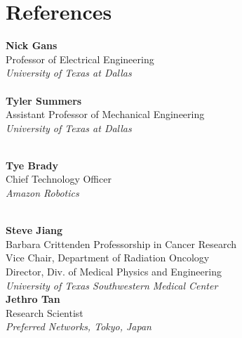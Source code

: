 \section{References}
\noindent
\begin{multicols}{2}
	
	\textbf{Nick Gans}\\
	Professor of Electrical Engineering
	\\
	\emph{University of Texas at  Dallas}
	\\\\
	\textbf{Tyler Summers}\\
	Assistant Professor of Mechanical Engineering 
	\\
	\emph{University of Texas at Dallas}\\\
	
	\textbf{Tye Brady}\\
		Chief Technology Officer	\\
	\emph{Amazon Robotics}\\\\
	
	\columnbreak
	
	\textbf{Steve Jiang}\\
	Barbara Crittenden Professorship in Cancer Research \\
	Vice Chair, Department of Radiation Oncology \\
	Director, Div. of Medical Physics and Engineering \\	
	\emph{University of Texas Southwestern Medical Center}\\
	
	\textbf{Jethro Tan}\\
	Research Scientist\\
	\emph{Preferred Networks, Tokyo, Japan}
	
	
\end{multicols}